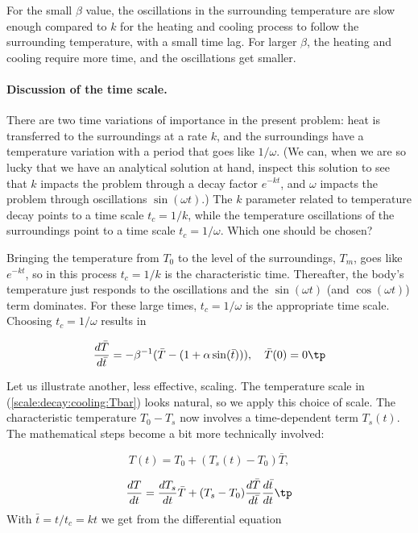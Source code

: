 \documentclass[graybox,envcountchap,sectrefs,final]{svmonodo}
\begin{document}
For the small $\beta$ value, the oscillations in the surrounding
temperature are slow enough compared to $k$ for the heating and
cooling process to follow the surrounding temperature, with a small
time lag. For larger $\beta$, the heating and cooling require more
time, and the oscillations get smaller.

\paragraph{Discussion of the time scale.}
There are two time variations of importance in the present problem:
heat is transferred to the surroundings at a rate $k$, and the
surroundings have a temperature variation with a period that goes like
$1/\omega$. (We can, when we are so lucky that we have an analytical
solution at hand, inspect this solution to see that $k$ impacts the
problem through a decay factor $e^{-kt}$, and $\omega$ impacts the problem
through oscillations $\sin(\omega t)$.)  The $k$ parameter related to
temperature decay points to a time scale $t_c=1/k$, while the
temperature oscillations of the surroundings point to a time scale
$t_c=1/\omega$.  Which one should be chosen?

Bringing the temperature from $T_0$ to the level of the surroundings,
$T_m$, goes like $e^{-kt}$, so in this process $t_c=1/k$ is the
characteristic time. Thereafter, the body's temperature just responds
to the oscillations and the $\sin (\omega t)$ (and $\cos(\omega t)$)
term dominates. For these large times, $t_c=1/\omega$ is the
appropriate time scale. Choosing $t_c=1/\omega$ results in

\begin{equation}
\frac{d\bar T}{d\bar t} = -\beta^{-1}(\bar T - (1 + \alpha\sin (\bar t))),\quad
\bar T(0)=0\tp
\label{scale:decay:cooling:model:scaled2}
\end{equation}


Let us illustrate another, less effective, scaling.
The temperature scale in
(\ref{scale:decay:cooling:Tbar}) looks natural, so we apply this
choice of scale. The characteristic temperature $T_0-T_s$
now involves
a time-dependent term $T_s(t)$. The mathematical steps become a bit
more technically involved:

\[ T(t) = T_0 + (T_s(t)-T_0)\bar T,\]

\[ \frac{dT}{dt} = \frac{dT_s}{dt}\bar T +
(T_s-T_0)\frac{d\bar T}{d\bar t}\frac{d\bar t}{dt}
\tp
\]
With $\bar t = t/t_c = kt$ we get from the differential equation
\end{document}
